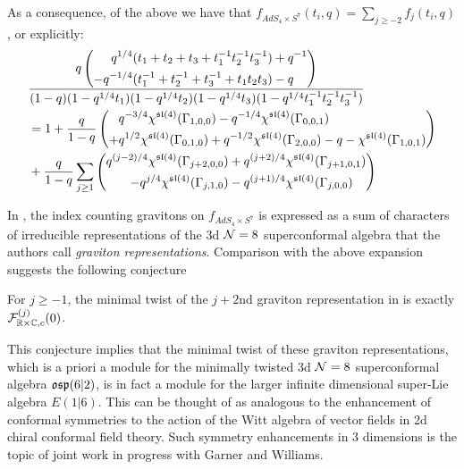 \parsec[]
As a consequence, of the above we have that $f_{AdS_4\times S^7} (t_i, q) = \sum_{j\geq -2} f_j (t_i, q)$, or explicitly:
\begin{align*}
& \frac{q\left (\begin{aligned} q^{1/4}(t_1+ t_2 + t_3+t_1^{-1}t_2^{-1}t_3^{-1}) &+ q^{-1} \\- q^{-1/4}(t_1^{-1}+ t_2^{-1} + t_3^{-1}+t_1t_2t_3) &- q   \end{aligned}\right)}{(1-q)(1-q^{1/4}t_1)(1-q^{1/4}t_2)(1-q^{1/4}t_3)(1-q^{1/4}t_1^{-1}t_2^{-1}t_3^{-1})}  \\ 
& =  1 + \frac{q}{1-q} \left (\begin{aligned} & q^{-3/4}\chi^{\mathfrak{sl}(4)}(\Gamma_{1,0,0}) - q^{-1/4}\chi^{\mathfrak{sl}(4)}(\Gamma_{0,0,1}) \\+ & q^{1/2}\chi^{\mathfrak{sl}(4)}(\Gamma_{0,1,0})  + q^{-1/2}\chi^{\mathfrak{sl}(4)}(\Gamma_{2,0,0})  - q - \chi^{\mathfrak{sl}(4)}(\Gamma_{1,0,1}) \end{aligned}\right ) \\
& + \frac{q}{1-q} \sum_{j\geq 1} \left (\begin{aligned} q^{(j-2)/4}\chi^{\mathfrak{sl}(4)}(\Gamma_{j+2,0,0})  &+ q^{(j+2)/4}\chi^{\mathfrak{sl}(4)}(\Gamma_{j+1,0,1}) \\ - q^{j/4}\chi^{\mathfrak{sl}(4)}(\Gamma_{j,1,0}) & - q^{(j+1)/4}\chi^{\mathfrak{sl}(4)}(\Gamma_{j,0,0}) \end{aligned}\right ) 
\end{align*}

In \cite[Eq. (2.15, 2.16)]{Bhattacharya:2008zy}, the index counting gravitons on $f_{AdS_4\times S^7}$ is expressed as a sum of characters of irreducible representations of the 3d $\mathcal{N} = 8$ superconformal algebra that the authors call \textit{graviton representations}. Comparison with the above expansion suggests the following conjecture

\begin{conj}\label{conj:e16gravitonrep}
For $j\geq -1$, the minimal twist of the $j+2$nd graviton representation in \cite[Eq. (2.15, 2.16)]{Bhattacharya:2008zy} is exactly $\mathcal{F}^{(j)}_{\mathbb{R}\times \mathbb{C}, c}(0)$. 
\end{conj}

\begin{rmk}\label{rmk:e16enhance}
This conjecture implies that the minimal twist of these graviton representations, which is a priori a module for the minimally twisted 3d $\mathcal{N}=8$ superconformal algebra $\mathfrak{osp}(6|2)$, is in fact a module for the larger infinite dimensional super-Lie algebra $E(1|6)$. This can be thought of as analogous to the enhancement of conformal symmetries to the action of the Witt algebra of vector fields in 2d chiral conformal field theory. Such symmetry enhancements in 3 dimensions is the topic of joint work in progress with Garner and Williams.
\end{rmk}
